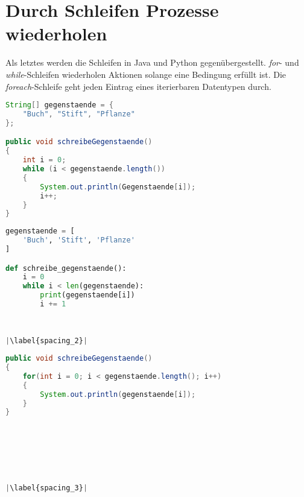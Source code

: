 \section{Durch Schleifen Prozesse wiederholen}
Als letztes werden die Schleifen in Java und Python gegenübergestellt. \textit{for}- und \textit{while}-Schleifen wiederholen Aktionen solange eine Bedingung erfüllt ist. Die \textit{foreach}-Schleife geht jeden Eintrag eines iterierbaren Datentypen durch.

\begin{minipage}{.5\linewidth}
\begin{lstlisting}[language=java,caption={while-Schleife Java},captionpos=b,label={lst:java:while},frame=none]
String[] gegenstaende = {
    "Buch", "Stift", "Pflanze"
};

public void schreibeGegenstaende()
{
    int i = 0;
    while (i < gegenstaende.length())
    {
        System.out.println(Gegenstaende[i]);
        i++;
    }
}
\end{lstlisting}
\end{minipage}
\begin{minipage}{.5\linewidth}
\begin{lstlisting}[language=python,caption={while-Schleife Python},captionpos=b,label={lst:python:while},frame=l,escapechar=|]
gegenstaende = [
    'Buch', 'Stift', 'Pflanze'
]

def schreibe_gegenstaende():
    i = 0
    while i < len(gegenstaende):
        print(gegenstaende[i])
        i += 1
        
        

|\label{spacing_2}|
\end{lstlisting}
\end{minipage}

\begin{minipage}{.5\linewidth}
\begin{lstlisting}[language=java,caption={for-Schleife Java},captionpos=b,label={lst:java:for},frame=none]
public void schreibeGegenstaende()
{
    for(int i = 0; i < gegenstaende.length(); i++)
    {
        System.out.println(gegenstaende[i]);
    }
}
\end{lstlisting}
\end{minipage}
\begin{minipage}{.5\linewidth}
\begin{lstlisting}[language=python,caption={for-Schleife Python},captionpos=b,label={lst:python:for},frame=l,escapechar=|]



        
        

|\label{spacing_3}|
\end{lstlisting}
\end{minipage}


